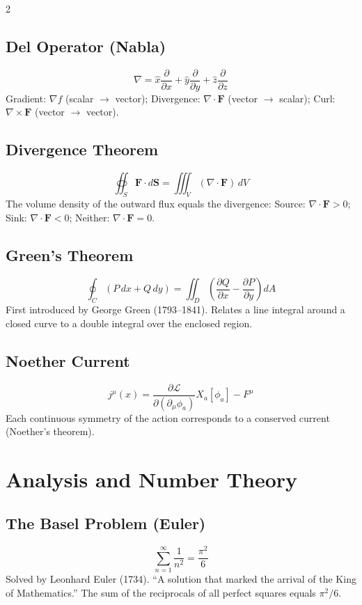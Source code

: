 \documentclass[10pt,a4paper]{article}
\begin{document}
\begin{multicols}{2}
\subsection{Del Operator (Nabla)}
\[
\nabla = \hat{x}\frac{\partial}{\partial x} + \hat{y}\frac{\partial}{\partial y} + \hat{z}\frac{\partial}{\partial z}
\]
Gradient: $\nabla f$ (scalar $\to$ vector); Divergence: $\nabla \cdot \mathbf{F}$ (vector $\to$ scalar); Curl: $\nabla \times \mathbf{F}$ (vector $\to$ vector).

\subsection{Divergence Theorem}
\[
\oiint_S \mathbf{F}\cdot d\mathbf{S} = \iiint_V (\nabla\cdot\mathbf{F})\,dV
\]
The volume density of the outward flux equals the divergence: Source: $\nabla\cdot\mathbf{F} > 0$; Sink: $\nabla\cdot\mathbf{F} < 0$; Neither: $\nabla\cdot\mathbf{F} = 0$.

\subsection{Green's Theorem}
\[
\oint_C (P\,dx + Q\,dy) = \iint_D \left(\frac{\partial Q}{\partial x} - \frac{\partial P}{\partial y}\right)dA
\]
First introduced by George Green (1793--1841). Relates a line integral around a closed curve to a double integral over the enclosed region.

\subsection{Noether Current}
\[
j^\mu(x) = \frac{\partial\mathcal{L}}{\partial(\partial_\mu \phi_a)} X_a[\phi_a] - F^\mu
\]
Each continuous symmetry of the action corresponds to a conserved current (Noether's theorem).

\section{Analysis and Number Theory}

\subsection{The Basel Problem (Euler)}
\[
\sum_{n=1}^{\infty} \frac{1}{n^2} = \frac{\pi^2}{6}
\]
Solved by Leonhard Euler (1734). ``A solution that marked the arrival of the King of Mathematics.'' The sum of the reciprocals of all perfect squares equals $\pi^2/6$.


\end{multicols}
\end{document}
